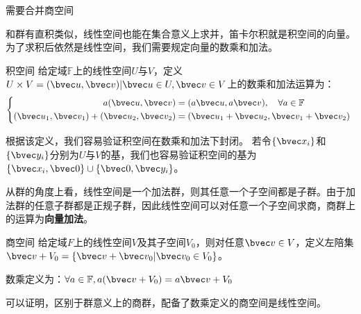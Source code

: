 

\begin{issues}
\issueDraft 
需要合并商空间
\end{issues}
和群有直积类似，线性空间也能在集合意义上求并，笛卡尔积就是积空间的向量。为了求积后依然是线性空间，我们需要规定向量的数乘和加法。

\begin{definition}{积空间}
给定域$\mathbb F $上的线性空间$U$与$V$，定义$U\times V={(\bvec u,\bvec v)|\bvec u\in U,\bvec v\in V}$上的数乘和加法运算为：
\begin{equation}
\left\{\begin{aligned}
a(\bvec u,\bvec v)&=(a\bvec u,a\bvec v),\quad \forall a\in \mathbb F\\
(\bvec u_1,\bvec v_1)+(\bvec u_2,\bvec v_2)&=(\bvec u_1+\bvec u_2,\bvec v_1+\bvec v_2)
\end{aligned}\right.~
\end{equation}
\end{definition}
根据该定义，我们容易验证积空间在数乘和加法下封闭。
若令$\{\bvec x_i\}$和$\{\bvec y_i\}$分别为$U$与$V$的基，我们也容易验证积空间的基为$\{\bvec x_i,\bvec 0\}\cup \{\bvec 0,\bvec y_i\}$。

从群的角度上看，线性空间是一个加法群，则其任意一个子空间都是子群。由于加法群的任意子群都是正规子群，因此线性空间可以对任意一个子空间求商，商群上的运算为\textbf{向量加法}。
\begin{definition}{商空间}
给定域$F$上的线性空间$V$及其子空间$V_0$，则对任意$\bvec v\in V$，定义左陪集$\bvec v+V_0=\{\bvec v+\bvec v_0|\bvec v_0\in V_0\}$。

数乘定义为：$\forall a\in \mathbb F,a(\bvec v+V_0)=a\bvec v+V_0$
\end{definition}
可以证明，区别于群意义上的商群，配备了数乘定义的商空间是线性空间。